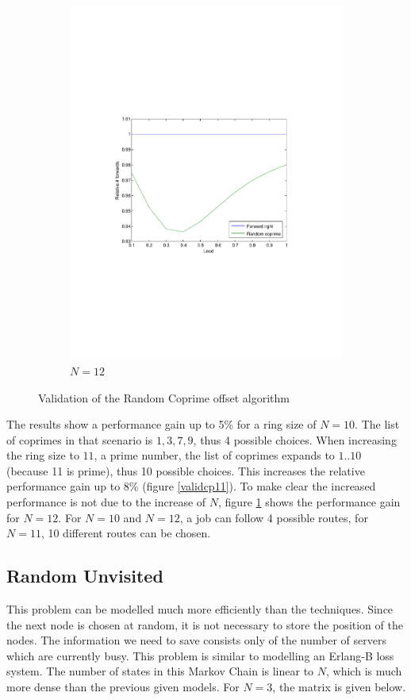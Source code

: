 \documentclass[10pt,a4paper]{article}
\begin{document}
\begin{figure}
\begin{subfigure}[b]{0.49\textwidth}
			\includegraphics[clip=true, trim=9em 24em 9em 24em, width=\textwidth]{resources/plotrandcoprime12.pdf}
			\caption{$N=12$}
			\label{validcp12}
		\end{subfigure}
\caption{Validation of the Random Coprime offset algorithm}
\label{validcp}
\end{figure}

The results show a performance gain up to 5\% for a ring size of $N=10$. The list of coprimes in that scenario is ${1, 3, 7, 9}$, thus 4 possible choices. When increasing the ring size to $11$, a prime number, the list of coprimes expands to ${1..10}$ (because 11 is prime), thus 10 possible choices. This increases the relative performance gain up to 8\% (figure \ref{validcp11}). To make clear the increased performance is not due to the increase of $N$, figure \ref{validcp12} shows the performance gain for $N=12$. For $N=10$ and $N=12$, a job can follow 4 possible routes, for $N=11$, 10 different routes can be chosen.


\subsection*{Random Unvisited}
This problem can be modelled much more efficiently than the techniques. Since the next node is chosen at random, it is not necessary to store the position of the nodes. The information we need to save consists only of the number of servers which are currently busy. This problem is similar to modelling an Erlang-B loss system. The number of states in this Markov Chain is linear to $N$, which is much more dense than the previous given models. For $N=3$, the matrix is given below.
\end{document}
